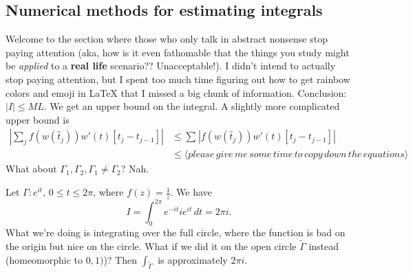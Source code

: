 \subsection{Numerical methods for estimating integrals}
Welcome to the section where those who only talk in abstract nonsense stop paying attention (aka, how is it even fathomable that the things you study might be \emph{applied} to a \textbf{real life} scenario?? Unacceptable!). I didn't intend to actually stop paying attention, but I spent too much time figuring out how to get rainbow colors and emoji in \LaTeX{} that I missed a big chunk of information. Conclusion: $|I|\leq ML$. We get an upper bound on the integral. A slightly more complicated upper bound is 
\begin{align*}
    \left| \sum_{j}^{} f(w(\hat{t}_j))w'(t)[t_j-t_{j-1}] \right| &\leq \sum_{}^{} \left| f(w(\hat{t}_j))w'(t)[t_j-t_{j-1}] \right|\\
                                                                 &\leq \langle please \,give\, me\, some\, time \,to \,copy \,down\, the \,equations \rangle 
\end{align*}
What about $\Gamma_1,\Gamma_2, \Gamma_1\neq\Gamma_2$? Nah.
\begin{example}[important]
    Let $\Gamma \colon e^{it},\,0\leq t \leq 2 \pi$, where $f(z)=\frac{1}{z}$. We have \[
    I=\int_{0}^{2\pi} e^{-it}ie^{it} \, dt=2\pi i.
\] What we're doing is integrating over the full circle, where the function is bad on the origin but nice on the circle. What if we did it on the open circle $\widetilde{\Gamma}$ instead (homeomorphic to $0,1)$)? Then $\int _{\widetilde{\Gamma}} $ is approximately $2\pi i$.
\end{example}



